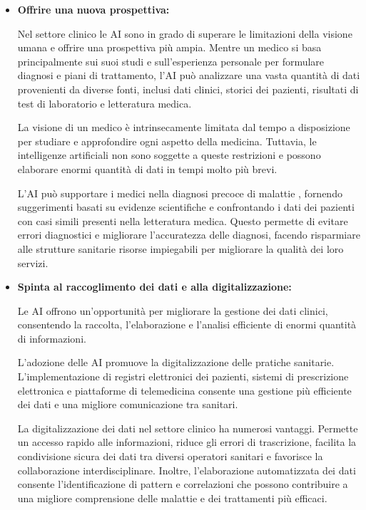 \begin{itemize}
    \item \textbf{Offrire una nuova prospettiva:} 

    Nel settore clinico le AI sono in grado di superare le limitazioni della visione umana e offrire una prospettiva più ampia. 
    Mentre un medico si basa principalmente sui suoi studi e sull'esperienza personale per formulare diagnosi e piani di trattamento, l'AI può analizzare una vasta quantità di dati provenienti da diverse fonti, inclusi dati clinici, storici dei pazienti, risultati di test di laboratorio e letteratura medica.

    La visione di un medico è intrinsecamente limitata dal tempo a disposizione per studiare e approfondire ogni aspetto della medicina. Tuttavia, le intelligenze artificiali non sono soggette a queste restrizioni e possono elaborare enormi quantità di dati in tempi molto più brevi.
    
    L'AI può supportare i medici nella diagnosi precoce di malattie \cite{articolo1_retinopatia}, fornendo suggerimenti basati su evidenze scientifiche e confrontando i dati dei pazienti con casi simili presenti nella letteratura medica. Questo permette di evitare errori diagnostici e migliorare l'accuratezza delle diagnosi, facendo risparmiare alle strutture sanitarie risorse impiegabili per migliorare la qualità dei loro servizi.
    \item \textbf{Spinta al raccoglimento dei dati e alla digitalizzazione:}

    Le AI offrono un'opportunità per migliorare la gestione dei dati clinici, consentendo la raccolta, l'elaborazione e l'analisi efficiente di enormi quantità di informazioni.

    L'adozione delle AI promuove la digitalizzazione delle pratiche sanitarie. L'implementazione di registri elettronici dei pazienti, sistemi di prescrizione elettronica e piattaforme di telemedicina consente una gestione più efficiente dei dati e una migliore comunicazione tra  sanitari. 

    La digitalizzazione dei dati nel settore clinico ha numerosi vantaggi. Permette un accesso rapido alle informazioni, riduce gli errori di trascrizione, facilita la condivisione sicura dei dati tra diversi operatori sanitari e favorisce la collaborazione interdisciplinare. Inoltre, l'elaborazione automatizzata dei dati consente l'identificazione di pattern e correlazioni che possono contribuire a una migliore comprensione delle malattie e dei trattamenti più efficaci.
\end{itemize}

